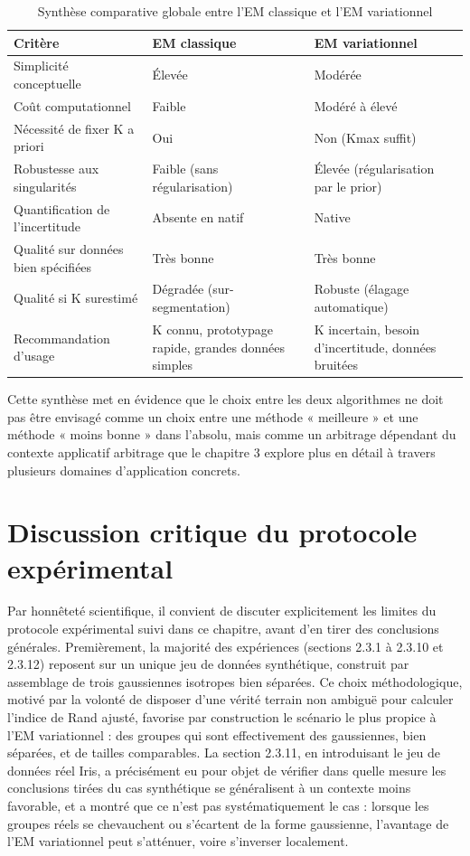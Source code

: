 \begin{table}[H]
\centering
\small
\setlength{\tabcolsep}{0.14cm}
\begin{tabular}{|p{4.84cm}|p{4.84cm}|p{4.84cm}|}
\hline
\textbf{Critère} & \textbf{EM classique} & \textbf{EM variationnel} \\
\hline
Simplicité conceptuelle & Élevée & Modérée \\
\hline
Coût computationnel & Faible & Modéré à élevé \\
\hline
Nécessité de fixer K a priori & Oui & Non (Kmax suffit) \\
\hline
Robustesse aux singularités & Faible (sans régularisation) & Élevée (régularisation par le prior) \\
\hline
Quantification de l'incertitude & Absente en natif & Native \\
\hline
Qualité sur données bien spécifiées & Très bonne & Très bonne \\
\hline
Qualité si K surestimé & Dégradée (sur-segmentation) & Robuste (élagage automatique) \\
\hline
Recommandation d'usage & K connu, prototypage rapide, grandes données simples & K incertain, besoin d'incertitude, données bruitées \\
\hline
\end{tabular}
\caption{Synthèse comparative globale entre l'EM classique et l'EM variationnel}
\label{tab:2_15}
\end{table}
Cette synthèse met en évidence que le choix entre les deux algorithmes ne doit pas être envisagé comme un choix entre une méthode « meilleure » et une méthode « moins bonne » dans l'absolu, mais comme un arbitrage dépendant du contexte applicatif  arbitrage que le chapitre 3 explore plus en détail à travers plusieurs domaines d'application concrets.

\section{Discussion critique du protocole expérimental}
Par honnêteté scientifique, il convient de discuter explicitement les limites du protocole expérimental suivi dans ce chapitre, avant d'en tirer des conclusions générales. Premièrement, la majorité des expériences (sections 2.3.1 à 2.3.10 et 2.3.12) reposent sur un unique jeu de données synthétique, construit par assemblage de trois gaussiennes isotropes bien séparées. Ce choix méthodologique, motivé par la volonté de disposer d'une vérité terrain non ambiguë pour calculer l'indice de Rand ajusté, favorise par construction le scénario le plus propice à l'EM variationnel : des groupes qui sont effectivement des gaussiennes, bien séparées, et de tailles comparables. La section 2.3.11, en introduisant le jeu de données réel Iris, a précisément eu pour objet de vérifier dans quelle mesure les conclusions tirées du cas synthétique se généralisent à un contexte moins favorable, et a montré que ce n'est pas systématiquement le cas : lorsque les groupes réels se chevauchent ou s'écartent de la forme gaussienne, l'avantage de l'EM variationnel peut s'atténuer, voire s'inverser localement.

